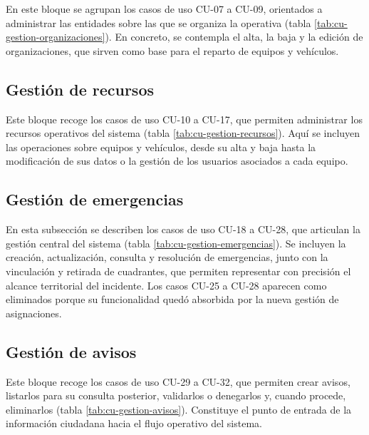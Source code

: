 En este bloque se agrupan los casos de uso CU-07 a CU-09, orientados a administrar las entidades sobre las que se organiza la operativa (tabla \ref{tab:cu-gestion-organizaciones}). En concreto, se contempla el alta, la baja y la edición de organizaciones, que sirven como base para el reparto de equipos y vehículos.



\subsection{Gestión de recursos}

Este bloque recoge los casos de uso CU-10 a CU-17, que permiten administrar los recursos operativos del sistema (tabla \ref{tab:cu-gestion-recursos}). Aquí se incluyen las operaciones sobre equipos y vehículos, desde su alta y baja hasta la modificación de sus datos o la gestión de los usuarios asociados a cada equipo.



\subsection{Gestión de emergencias}

En esta subsección se describen los casos de uso CU-18 a CU-28, que articulan la gestión central del sistema (tabla \ref{tab:cu-gestion-emergencias}). Se incluyen la creación, actualización, consulta y resolución de emergencias, junto con la vinculación y retirada de cuadrantes, que permiten representar con precisión el alcance territorial del incidente. Los casos CU-25 a CU-28 aparecen como eliminados porque su funcionalidad quedó absorbida por la nueva gestión de asignaciones.



\subsection{Gestión de avisos}

Este bloque recoge los casos de uso CU-29 a CU-32, que permiten crear avisos, listarlos para su consulta posterior, validarlos o denegarlos y, cuando procede, eliminarlos (tabla \ref{tab:cu-gestion-avisos}). Constituye el punto de entrada de la información ciudadana hacia el flujo operativo del sistema.



